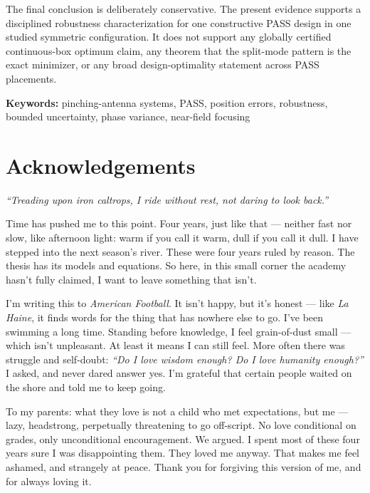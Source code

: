 The final conclusion is deliberately conservative. The present evidence supports a disciplined robustness characterization for one constructive PASS design in one studied symmetric configuration. It does not support any globally certified continuous-box optimum claim, any theorem that the split-mode pattern is the exact minimizer, or any broad design-optimality statement across PASS placements.

\noindent\textbf{Keywords:} pinching-antenna systems, PASS, position errors, robustness, bounded uncertainty, phase variance, near-field focusing

\clearpage
\tableofcontents
\clearpage
\listoffigures
\clearpage
\listoftables
\clearpage
\section*{Acknowledgements}

\begin{flushright}
\textit{``Treading upon iron caltrops, I ride without rest, not daring to look back.''}
\end{flushright}


Time has pushed me to this point. Four years, just like that --- neither fast nor slow, like afternoon light: warm if you call it warm, dull if you call it dull. I have stepped into the next season's river. These were four years ruled by reason. The thesis has its models and equations. So here, in this small corner the academy hasn't fully claimed, I want to leave something that isn't.

I'm writing this to \textit{American Football}. It isn't happy, but it's honest --- like \textit{La Haine}, it finds words for the thing that has nowhere else to go. I've been swimming a long time. Standing before knowledge, I feel grain-of-dust small --- which isn't unpleasant. At least it means I can still feel. More often there was struggle and self-doubt: \textit{``Do I love wisdom enough? Do I love humanity enough?''} I asked, and never dared answer yes. I'm grateful that certain people waited on the shore and told me to keep going.

To my parents: what they love is not a child who met expectations, but me --- lazy, headstrong, perpetually threatening to go off-script. No love conditional on grades, only unconditional encouragement. We argued. I spent most of these four years sure I was disappointing them. They loved me anyway. That makes me feel ashamed, and strangely at peace. Thank you for forgiving this version of me, and for always loving it.

